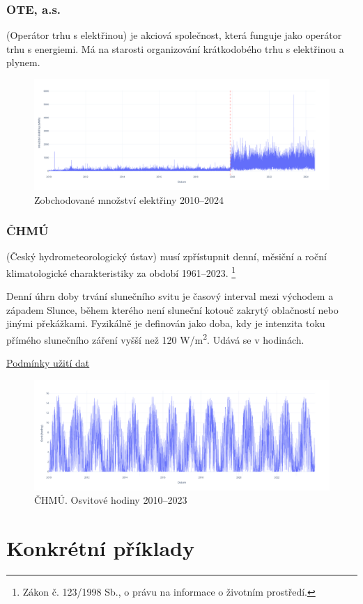 \subsubsection*{OTE, a.s.}
(Operátor trhu s elektřinou) je akciová společnost, která funguje jako operátor trhu s energiemi.
Má na starosti organizování krátkodobého trhu s elektřinou a plynem.
\begin{figure}[H]
    \includegraphics[width=\textwidth]{static/graphs/ote.png}
    \caption{Zobchodované množství elektřiny 2010--2024}
    \label{fig:ote}
\end{figure}

 
\subsubsection*{ČHMÚ} (Český hydrometeorologický ústav) musí zpřístupnit denní, měsiční a roční klimatologické charakteristiky za období 1961--2023. \footnote[1]{Zákon č. 123/1998 Sb., o právu na informace o životním prostředí.}

Denní úhrn doby trvání slunečního svitu je časový interval mezi východem a západem Slunce,
během kterého není sluneční kotouč zakrytý oblačností nebo jinými překážkami.
Fyzikálně je definován jako doba, kdy je intenzita toku přímého slunečního záření vyšší než 120 \si{\watt}/\si{\meter\squared}.
Udává se v hodinách.

\href{https://www.chmi.cz/files/portal/docs/meteo/ok/open_data_2023/Podminky_uziti_udaju.pdf}{Podmínky užití dat}

\begin{figure}[H]
    \includegraphics[width=\textwidth]{static/graphs/osvit.png}
    \caption{ČHMÚ. Osvitové hodiny 2010--2023}
    \label{fig:ote}
\end{figure}


\section{Konkrétní příklady}